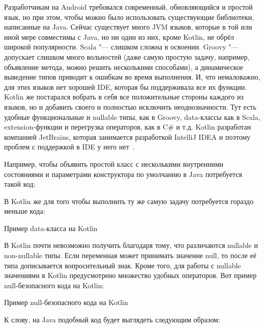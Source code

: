 Разработчикам на Android требовался современный, обновляющийся и простой язык, но при этом, чтобы можно было использовать существующие библиотеки, написанные на Java.
Сейчас существует много JVM языков, которые в той или иной мере совместимы с Java, но ни один из них, кроме Kotlin, не обрёл широкой популярности.
Scala "--- слишком сложна в освоении.
Groovy "--- допускает слишком много вольностей (даже самую простую задачу, например, объявление метода, можно решить несколькими способами), а динамическое выведение типов приводит к ошибкам во время выполнения.
И, что немаловажно, для этих языков нет хорошей IDE, которая бы поддерживала все их функции.
Kotlin же постарался вобрать в себя все положительные стороны каждого из языков, но и добавить своего и полностью исключить неоднозначности.
Тут есть удобные функциональные и nullable типы, как в Groovy, data-классы как в Scala, extension-функции и перегрузка операторов, как в C\# и т.д.
Kotlin разработан компанией JetBrains, которая занимается разработкой IntelliJ IDEA и поэтому проблем с поддержкой в IDE у него нет~\cite{kotlin:features}.

Например, чтобы объявить простой класс с несколькими внутренними состояниями и параметрами конструктора по умолчанию в Java потребуется такой код:\\

\begingroup
\endgroup

В Kotlin же для того чтобы выполнить ту же самую задачу потребуется гораздо меньше кода:

\begin{listing}[H]
  \caption{Пример data-класса на Kotlin}
  \label{lst:studentKt}
\end{listing}

В Kotlin почти невозможно получить  благодаря тому, что различаются nullable и non-nullable типы.
Если переменная может принимать значение null, то после её типа дописывается вопросительный знак.
Кроме того, для работы с nullable значениями в Kotlin предусмотрено множество удобных операторов.
Вот пример null-безопасного кода на Kotlin:

\begin{listing}[H]
  \caption{Пример null-безопасного кода на Kotlin}
  \label{lst:nullKt}
\end{listing}

К слову, на Java подобный код будет выглядеть следующим образом:

